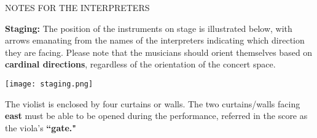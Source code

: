 \documentclass[12pt]{article}
\begin{document}
\vspace*{1\baselineskip}

\begingroup
\begin{center}
\huge NOTES FOR THE INTERPRETERS
\end{center}
\endgroup


\begingroup
\textbf{Staging:} The position of the instruments on stage is illustrated below, with arrows emanating from the names of the interpreters indicating which direction they are facing. Please note that the musicians should orient themselves based on \textbf{cardinal directions}, regardless of the orientation of the concert space. 
\begin{center}
\texttt{[image: staging.png]}\\
\end{center}
The violist is enclosed by four curtains or walls. The two curtains/walls facing \textbf{east} must be able to be opened during the performance, referred in the score as the viola's \textbf{``gate."}
\endgroup
\end{document}
